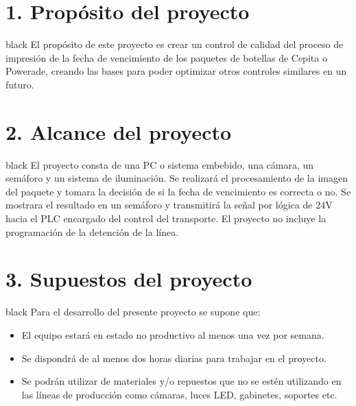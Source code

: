 \documentclass[11pt]{charter}
\begin{document}
\section{1. Propósito del proyecto}
\label{sec:proposito}

\begin{consigna}{black}
El propósito de este proyecto es crear un control de calidad del proceso de impresión de la fecha de vencimiento de los paquetes de botellas de Cepita o Powerade, creando las bases para poder optimizar otros controles similares en un futuro.

\end{consigna}

\section{2. Alcance del proyecto}
\label{sec:alcance}

\begin{consigna}{black}
El proyecto consta de una PC o sistema embebido, una cámara, un semáforo y un sistema de iluminación. \newline
Se realizará el procesamiento de la imagen del paquete y tomara la decisión de si la fecha de vencimiento es correcta o no. \newline
Se mostrara el resultado en un semáforo y transmitirá la señal por lógica de 24V hacia el PLC encargado del control del transporte. El proyecto no incluye la programación de la detención de la línea.
%
%
%
%
\end{consigna}


\section{3. Supuestos del proyecto}
\label{sec:supuestos}

\begin{consigna}{black}
Para el desarrollo del presente proyecto se supone que:

\begin{itemize}
\item El equipo estará en estado no productivo al menos una vez por semana.
\item Se dispondrá de al menos dos horas diarias para trabajar en el proyecto.
\item Se podrán utilizar de materiales y/o repuestos que no se estén utilizando en las líneas de producción como cámaras, luces LED, gabinetes, soportes etc.

\end{itemize}

\end{consigna}
\end{document}
